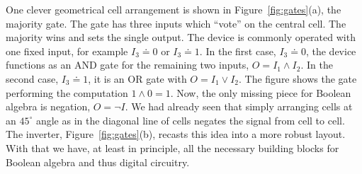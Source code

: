 One clever geometrical cell arrangement is shown in Figure~\ref{fig:gates}(a),
the majority gate. The gate has three inputs which ``vote'' on the central cell.
The majority wins and sets the single output. The device is commonly operated
with one fixed input, for example $I_3 \doteq 0$ or $I_3 \doteq 1$. In the first
case, $I_3 \doteq 0$, the device functions as an AND gate for the remaining two
inputs, $O = I_1 \land I_2$. In the second case, $I_3 \doteq 1$, it is an OR
gate with $O = I_1 \lor I_2$. The figure shows the gate performing the
computation $1 \land 0 = 1$. Now, the only missing piece for Boolean algebra is
negation, $O = \lnot I$. We had already seen that simply arranging cells at an
$45^{\circ}$ angle as in the diagonal line of cells negates the signal from cell
to cell. The inverter, Figure~\ref{fig:gates}(b), recasts this idea into a more
robust layout. With that we have, at least in principle, all the necessary
building blocks for Boolean algebra and thus digital circuitry.

